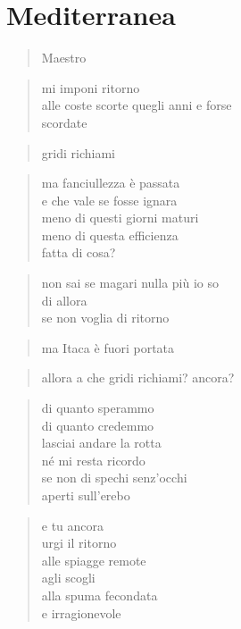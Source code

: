 \chapter{Mediterranea}
\label{mediterranea}%


	\begin{verse}
		Maestro
	\end{verse}

	\begin{verse}
		mi imponi ritorno\\
		alle coste scorte quegli anni e forse\\
		scordate
	\end{verse}

	\begin{verse}
		gridi richiami
	\end{verse}

	\begin{verse}
		ma fanciullezza è passata\\
		e che vale se fosse ignara\\
		meno di questi giorni maturi\\
		meno di questa efficienza\\
		fatta di cosa?
	\end{verse}

	\begin{verse}
		non sai se magari nulla più io so\\
		di allora\\
		se non voglia di ritorno
	\end{verse}

	\begin{verse}
		ma Itaca è fuori portata
	\end{verse}

	\begin{verse}
		allora a che gridi richiami? ancora?
	\end{verse}

	\begin{verse}
		di quanto sperammo\\
		di quanto credemmo\\
		lasciai andare la rotta\\
		né mi resta ricordo\\
		se non di spechi senz’occhi\\
		aperti sull’erebo
	\end{verse}

	\begin{verse}
		e tu ancora\\
		urgi il ritorno\\
		alle spiagge remote\\
		agli scogli\\
		alla spuma fecondata\\
		e irragionevole
	\end{verse}

